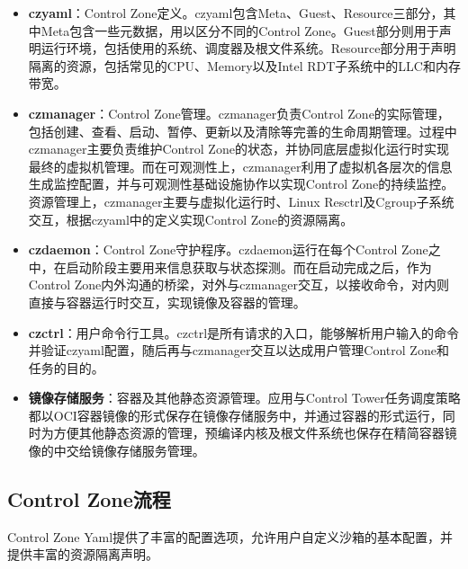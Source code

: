 \begin{itemize}
    \item \textbf{czyaml}：Control Zone定义。czyaml包含Meta、Guest、Resource三部分，其中Meta包含一些元数据，用以区分不同的Control Zone。Guest部分则用于声明运行环境，包括使用的系统、调度器及根文件系统。Resource部分用于声明隔离的资源，包括常见的CPU、Memory以及Intel RDT子系统中的LLC和内存带宽。
    \item \textbf{czmanager}：Control Zone管理。czmanager负责Control Zone的实际管理， 包括创建、查看、启动、暂停、更新以及清除等完善的生命周期管理。过程中czmanager主要负责维护Control Zone的状态，并协同底层虚拟化运行时实现最终的虚拟机管理。而在可观测性上，czmanager利用了虚拟机各层次的信息生成监控配置，并与可观测性基础设施协作以实现Control Zone的持续监控。资源管理上，czmanager主要与虚拟化运行时、Linux Resctrl及Cgroup子系统交互，根据czyaml中的定义实现Control Zone的资源隔离。
    \item \textbf{czdaemon}：Control Zone守护程序。czdaemon运行在每个Control Zone之中，在启动阶段主要用来信息获取与状态探测。而在启动完成之后，作为Control Zone内外沟通的桥梁，对外与czmanager交互，以接收命令，对内则直接与容器运行时交互，实现镜像及容器的管理。
    \item \textbf{czctrl}：用户命令行工具。czctrl是所有请求的入口，能够解析用户输入的命令并验证czyaml配置，随后再与czmanager交互以达成用户管理Control Zone和任务的目的。
    \item \textbf{镜像存储服务}：容器及其他静态资源管理。应用与Control Tower任务调度策略都以OCI容器镜像的形式保存在镜像存储服务中，并通过容器的形式运行，同时为方便其他静态资源的管理，预编译内核及根文件系统也保存在精简容器镜像的中交给镜像存储服务管理。
\end{itemize}

\subsection{Control Zone流程}



Control Zone Yaml提供了丰富的配置选项，允许用户自定义沙箱的基本配置，并提供丰富的资源隔离声明。

